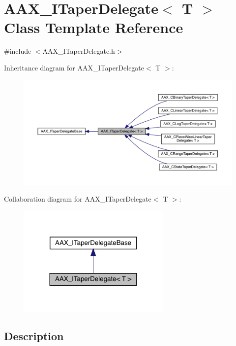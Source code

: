 \hypertarget{a01881}{}\section{A\+A\+X\+\_\+\+I\+Taper\+Delegate$<$ T $>$ Class Template Reference}
\label{a01881}


{\ttfamily \#include $<$A\+A\+X\+\_\+\+I\+Taper\+Delegate.\+h$>$}



Inheritance diagram for A\+A\+X\+\_\+\+I\+Taper\+Delegate$<$ T $>$\+:
\nopagebreak
\begin{figure}[H]
\begin{center}
\leavevmode
\includegraphics[width=350pt]{a01880}
\end{center}
\end{figure}


Collaboration diagram for A\+A\+X\+\_\+\+I\+Taper\+Delegate$<$ T $>$\+:
\nopagebreak
\begin{figure}[H]
\begin{center}
\leavevmode
\includegraphics[width=212pt]{a01879}
\end{center}
\end{figure}


\subsection{Description}
